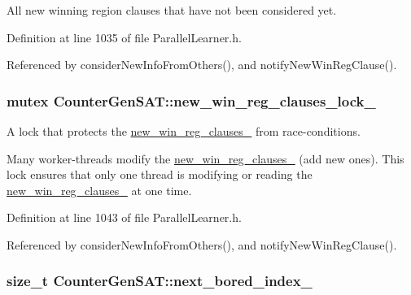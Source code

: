 All new winning region clauses that have not been considered yet. 



Definition at line 1035 of file Parallel\-Learner.\-h.



Referenced by consider\-New\-Info\-From\-Others(), and notify\-New\-Win\-Reg\-Clause().

\hypertarget{classCounterGenSAT_a120e7ea918e720bedb9b35a40e354307}{
\subsubsection[{new\-\_\-win\-\_\-reg\-\_\-clauses\-\_\-lock\-\_\-}]{\setlength{\rightskip}{0pt plus 5cm}mutex Counter\-Gen\-S\-A\-T\-::new\-\_\-win\-\_\-reg\-\_\-clauses\-\_\-lock\-\_\-\hspace{0.3cm}{\ttfamily [protected]}}}\label{classCounterGenSAT_a120e7ea918e720bedb9b35a40e354307}


A lock that protects the \hyperlink{classCounterGenSAT_a5a379bda175a32e3d4ccc0771fde024d}{new\-\_\-win\-\_\-reg\-\_\-clauses\-\_\-} from race-\/conditions. 

Many worker-\/threads modify the \hyperlink{classCounterGenSAT_a5a379bda175a32e3d4ccc0771fde024d}{new\-\_\-win\-\_\-reg\-\_\-clauses\-\_\-} (add new ones). This lock ensures that only one thread is modifying or reading the \hyperlink{classCounterGenSAT_a5a379bda175a32e3d4ccc0771fde024d}{new\-\_\-win\-\_\-reg\-\_\-clauses\-\_\-} at one time. 

Definition at line 1043 of file Parallel\-Learner.\-h.



Referenced by consider\-New\-Info\-From\-Others(), and notify\-New\-Win\-Reg\-Clause().

\hypertarget{classCounterGenSAT_a404764a6142a0cd55e1b3e40d2e0483b}{
\subsubsection[{next\-\_\-bored\-\_\-index\-\_\-}]{\setlength{\rightskip}{0pt plus 5cm}size\-\_\-t Counter\-Gen\-S\-A\-T\-::next\-\_\-bored\-\_\-index\-\_\-\hspace{0.3cm}{\ttfamily [protected]}}}\label{classCounterGenSAT_a404764a6142a0cd55e1b3e40d2e0483b}


